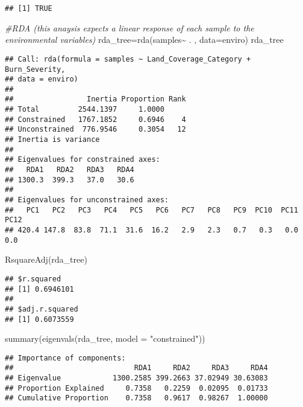 \documentclass[
]{article}
\newenvironment{Shaded}{\begin{snugshade}}{\end{snugshade}}
\newcommand{\AttributeTok}[1]{\textcolor[rgb]{0.77,0.63,0.00}{#1}}
\newcommand{\CommentTok}[1]{\textcolor[rgb]{0.56,0.35,0.01}{\textit{#1}}}
\newcommand{\FunctionTok}[1]{\textcolor[rgb]{0.00,0.00,0.00}{#1}}
\newcommand{\NormalTok}[1]{#1}
\newcommand{\OtherTok}[1]{\textcolor[rgb]{0.56,0.35,0.01}{#1}}
\newcommand{\SpecialCharTok}[1]{\textcolor[rgb]{0.00,0.00,0.00}{#1}}
\newcommand{\StringTok}[1]{\textcolor[rgb]{0.31,0.60,0.02}{#1}}
\begin{document}
\begin{verbatim}
## [1] TRUE
\end{verbatim}

\begin{Shaded}
\begin{Highlighting}[]
\CommentTok{\#RDA (this anaysis expects a linear response of each sample to the environmental variables)}
\NormalTok{rda\_tree}\OtherTok{=}\FunctionTok{rda}\NormalTok{(samples}\SpecialCharTok{\textasciitilde{}}\NormalTok{ . , }\AttributeTok{data=}\NormalTok{enviro)}
\NormalTok{rda\_tree}
\end{Highlighting}
\end{Shaded}

\begin{verbatim}
## Call: rda(formula = samples ~ Land_Coverage_Category + Burn_Severity,
## data = enviro)
## 
##                 Inertia Proportion Rank
## Total         2544.1397     1.0000     
## Constrained   1767.1852     0.6946    4
## Unconstrained  776.9546     0.3054   12
## Inertia is variance 
## 
## Eigenvalues for constrained axes:
##   RDA1   RDA2   RDA3   RDA4 
## 1300.3  399.3   37.0   30.6 
## 
## Eigenvalues for unconstrained axes:
##   PC1   PC2   PC3   PC4   PC5   PC6   PC7   PC8   PC9  PC10  PC11  PC12 
## 420.4 147.8  83.8  71.1  31.6  16.2   2.9   2.3   0.7   0.3   0.0   0.0
\end{verbatim}

\begin{Shaded}
\begin{Highlighting}[]
\FunctionTok{RsquareAdj}\NormalTok{(rda\_tree)}
\end{Highlighting}
\end{Shaded}

\begin{verbatim}
## $r.squared
## [1] 0.6946101
## 
## $adj.r.squared
## [1] 0.6073559
\end{verbatim}

\begin{Shaded}
\begin{Highlighting}[]
\FunctionTok{summary}\NormalTok{(}\FunctionTok{eigenvals}\NormalTok{(rda\_tree, }\AttributeTok{model =} \StringTok{"constrained"}\NormalTok{))}
\end{Highlighting}
\end{Shaded}

\begin{verbatim}
## Importance of components:
##                            RDA1     RDA2     RDA3     RDA4
## Eigenvalue            1300.2585 399.2663 37.02949 30.63083
## Proportion Explained     0.7358   0.2259  0.02095  0.01733
## Cumulative Proportion    0.7358   0.9617  0.98267  1.00000
\end{verbatim}
\end{document}
